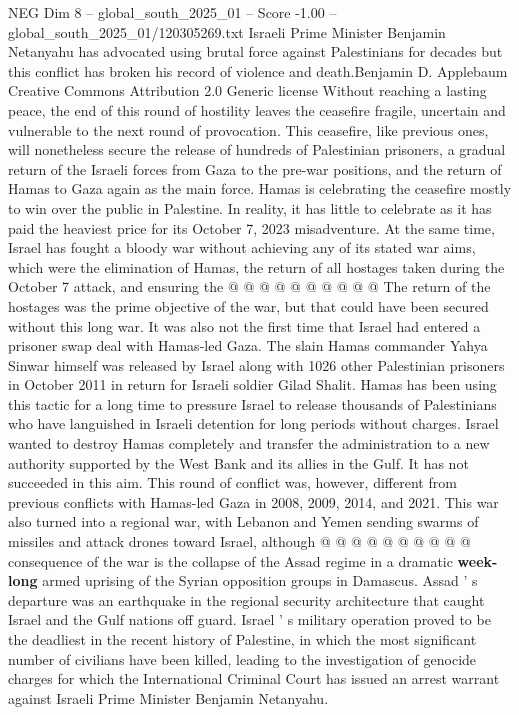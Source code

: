 \begin{textsample}{NEG Dim 8 – global\_south\_2025\_01 – Score -1.00 – global\_south\_2025\_01/120305269.txt}  \label{ex:f8_neg_334}
Israeli Prime Minister Benjamin Netanyahu has advocated using brutal force against Palestinians for decades but this conflict has broken his record of violence and death.Benjamin D.
Applebaum Creative Commons Attribution 2.0 Generic license Without reaching a lasting peace, the end of this round of hostility leaves the ceasefire fragile, uncertain and vulnerable to the next round of provocation.
This ceasefire, like previous ones, will nonetheless secure the release of hundreds of Palestinian prisoners, a gradual return of the Israeli forces from Gaza to the pre-war positions, and the return of Hamas to Gaza again as the main force.
Hamas is celebrating the ceasefire mostly to win over the public in Palestine.
In reality, it has little to celebrate as it has paid the heaviest price for its October 7, 2023 misadventure.
At the same time, Israel has fought a bloody war without achieving any of its stated war aims, which were the elimination of Hamas, the return of all hostages taken during the October 7 attack, and ensuring the @ @ @ @ @ @ @ @ @ @ The return of the hostages was the prime objective of the war, but that could have been secured without this long war.
It was also not the first time that Israel had entered a prisoner swap deal with Hamas-led Gaza.
The slain Hamas commander Yahya Sinwar himself was released by Israel along with 1026 other Palestinian prisoners in October 2011 in return for Israeli soldier Gilad Shalit.
Hamas has been using this tactic for a long time to pressure Israel to release thousands of Palestinians who have languished in Israeli detention for long periods without charges.
Israel wanted to destroy Hamas completely and transfer the administration to a new authority supported by the West Bank and its allies in the Gulf.
It has not succeeded in this aim.
This round of conflict was, however, different from previous conflicts with Hamas-led Gaza in 2008, 2009, 2014, and 2021.
This war also turned into a regional war, with Lebanon and Yemen sending swarms of missiles and attack drones toward Israel, although @ @ @ @ @ @ @ @ @ @ consequence of the war is the collapse of the Assad regime in a dramatic \textbf{week-long} armed uprising of the Syrian opposition groups in Damascus.
Assad ' s departure was an earthquake in the regional security architecture that caught Israel and the Gulf nations off guard.
Israel ' s military operation proved to be the deadliest in the recent history of Palestine, in which the most significant number of civilians have been killed, leading to the investigation of genocide charges for which the International Criminal Court has issued an arrest warrant against Israeli Prime Minister Benjamin Netanyahu.

\end{textsample}
